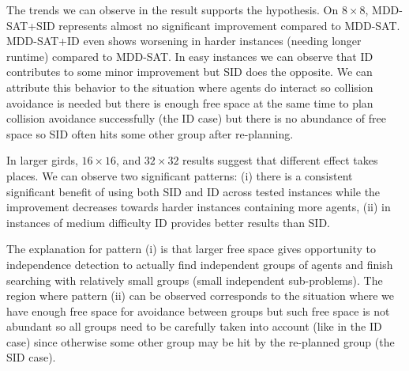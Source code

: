 \documentclass[jair,oneside,11pt]{article}
\begin{document}
The trends we can observe in the result supports the hypothesis. On $8{}\times{}8$, MDD-SAT+SID represents almost no significant improvement compared to MDD-SAT. MDD-SAT+ID even shows worsening in harder instances (needing longer runtime) compared to MDD-SAT. In easy instances we can observe that ID contributes to some minor improvement but SID does the opposite. We can attribute this behavior to the situation where agents do interact so collision avoidance is needed but there is enough free space at the same time to plan collision avoidance successfully (the ID case) but there is no abundance of free space so SID often hits some other group after re-planning.

In larger girds, $16{}\times{}16$, and $32{}\times{}32$ results suggest that different effect takes places. We can observe two significant patterns: (i) there is a consistent significant benefit of using both SID and ID across tested instances while the improvement decreases towards harder instances containing more agents, (ii) in instances of medium difficulty ID provides better results than SID.

The explanation for pattern (i) is that larger free space gives opportunity to independence detection to actually find independent groups of agents and finish searching with relatively small groups (small independent sub-problems). The region where pattern (ii) can be observed corresponds to the situation where we have enough free space for avoidance between groups but such free space is not abundant so all groups need to be carefully taken into account (like in the ID case) since otherwise some other group may be hit by the re-planned group (the SID case).
\end{document}
